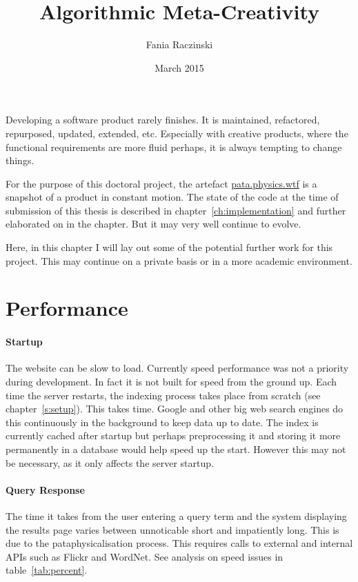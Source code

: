 \documentclass[11pt]{thesis} %
\title{Algorithmic Meta-Creativity}
\author{Fania Raczinski}
\date{March 2015}
\begin{document}
Developing a software product rarely finishes. It is maintained, refactored, repurposed, updated, extended, etc. Especially with creative products, where the functional requirements are more fluid perhaps, it is always tempting to change things. 

For the purpose of this doctoral project, the artefact \url{pata.physics.wtf} is a snapshot of a product in constant motion. The state of the code at the time of submission of this thesis is described in chapter~\ref{ch:implementation} and further elaborated on in the  chapter. But it may very well continue to evolve.

Here, in this chapter I will lay out some of the potential further work for this project. This may continue on a private basis or in a more academic environment. 


\section{Performance}


\paragraph{Startup} 
The website can be slow to load. Currently speed performance was not a priority during development. In fact it is not built for speed from the ground up. Each time the server restarts, the indexing process takes place from scratch (see chapter~\ref{s:setup}). This takes time. Google and other big web search engines do this continuously in the background to keep data up to date. The index is currently cached after startup but perhaps preprocessing it and storing it more permanently in a database would help speed up the start. However this may not be necessary, as it only affects the server startup.

\paragraph{Query Response} 
The time it takes from the user entering a query term and the system displaying the results page varies between unnoticable short and impatiently long. This is due to the pataphysicalisation process. This requires calls to external and internal \ac{API}s such as Flickr and WordNet. See analysis on speed issues in table~\ref{tab:percent}.
\end{document}
